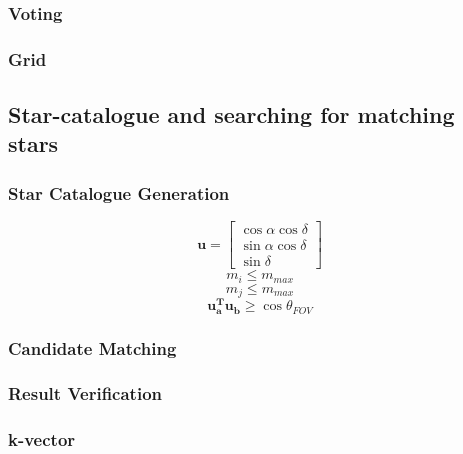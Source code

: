 \documentclass[12pt,a4paper,oneside]{article}
\begin{document}
\subsubsection{Voting}
\cite{kolomenkin2008geometric} \par
\subsubsection{Grid}
\cite{padgett1997grid}
\subsection{Star-catalogue and searching for matching stars}

\subsubsection{Star Catalogue Generation}
\begin{equation}
\bm{u} = \begin{bmatrix}
\cos \alpha \cos \delta \\
\sin \alpha \cos \delta \\
\sin \delta
\end{bmatrix}
\end{equation}
\begin{equation}
m_i \leq m_{max}
\end{equation}
\begin{equation}
m_j \leq m_{max}
\end{equation}
\begin{equation}
\bm{u_a^T u_b} \geq \cos \theta_{FOV}
\end{equation}

\subsubsection{Candidate Matching}
\subsubsection{Result Verification}
\subsubsection{k-vector}
\end{document}
